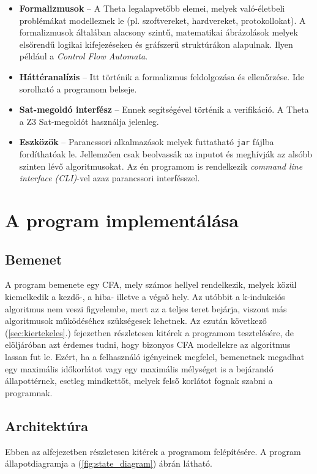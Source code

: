 \begin{itemize}
	\item \textbf{Formalizmusok} -- A Theta legalapvetőbb elemei, melyek való-életbeli problémákat modelleznek le (pl. szoftvereket, hardvereket, protokollokat). A formalizmusok általában alacsony szintű, matematikai ábrázolások melyek elsőrendű logikai kifejezéseken és gráfszerű struktúrákon alapulnak. Ilyen például a \emph{Control Flow Automata}.
	
	\item \textbf{Háttéranalízis} -- Itt történik a formalizmus feldolgozása és ellenőrzése. Ide sorolható a programom belseje.
	
	\item \textbf{Sat-megoldó interfész} -- Ennek segítségével történik a verifikáció. A Theta a Z3 Sat-megoldót használja jelenleg.
	
	\item \textbf{Eszközök} -- Parancssori alkalmazások melyek futtatható \verb+jar+ fájlba fordíthatóak le. Jellemzően csak beolvassák az inputot és meghívják az alsóbb szinten lévő algoritmusokat. Az én programom is rendelkezik \textit{command line interface (CLI)}-vel azaz parancssori interfésszel.
	
\end{itemize}

\section{A program implementálása}
\label{sec:prog_imp}

\subsection{Bemenet}
A program bemenete egy CFA, mely számos hellyel rendelkezik, melyek közül kiemelkedik a kezdő-, a hiba- illetve a végső hely. Az utóbbit a k-indukciós algoritmus nem veszi figyelembe, mert az a teljes teret bejárja, viszont más algoritmusok működéséhez szükségesek lehetnek. Az ezután következő (\ref{sec:kiertekeles}.) fejezetben részletesen kitérek a programom tesztelésére, de elöljáróban azt érdemes tudni, hogy bizonyos CFA modellekre az algoritmus  lassan fut le. Ezért, ha a felhasználó igényeinek megfelel, bemenetnek megadhat egy maximális időkorlátot vagy egy maximális mélységet is a bejárandó állapottérnek, esetleg mindkettőt, melyek felső korlátot fognak szabni a programnak.

\subsection{Architektúra}
\label{sec:architektura}
Ebben az alfejezetben részletesen kitérek a programom felépítésére. A program állapotdiagramja a (\ref{fig:state_diagram}) ábrán látható.

